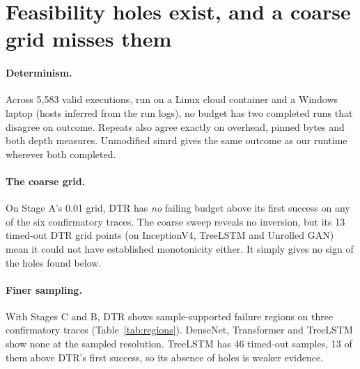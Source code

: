 \documentclass[11pt]{article}
\begin{document}
\section{Feasibility holes exist, and a coarse grid misses them}\label{sec:holes}

\paragraph{Determinism.} Across 5{,}583 valid executions, run on a Linux cloud container and
a Windows laptop (hosts inferred from the run logs), no budget has two completed runs that
disagree on outcome. Repeats also agree exactly on
overhead, pinned bytes and both depth measures. Unmodified simrd gives the same outcome as
our runtime wherever both completed.

\paragraph{The coarse grid.} On Stage A's 0.01 grid, DTR has \emph{no} failing budget above
its first success on any of the six confirmatory traces. The coarse sweep reveals no
inversion, but its 13 timed-out DTR grid points (on InceptionV4, TreeLSTM and Unrolled GAN)
mean it could not have established monotonicity either. It simply gives no sign of the holes
found below.

\paragraph{Finer sampling.} With Stages C and B, DTR shows sample-supported failure regions
on three confirmatory traces (Table~\ref{tab:regions}). DenseNet, Transformer and
TreeLSTM show none at the sampled resolution. TreeLSTM has 46 timed-out samples, 13 of them above DTR's first
success, so its absence of holes is weaker evidence.
\end{document}
